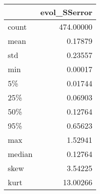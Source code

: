 \begin{tabular}{lr}
\toprule
{} &  evol\_SSerror \\
\midrule
count  &     474.00000 \\
mean   &       0.17879 \\
std    &       0.23557 \\
min    &       0.00017 \\
5\%     &       0.01744 \\
25\%    &       0.06903 \\
50\%    &       0.12764 \\
95\%    &       0.65623 \\
max    &       1.52941 \\
median &       0.12764 \\
skew   &       3.54225 \\
kurt   &      13.00266 \\
\bottomrule
\end{tabular}
